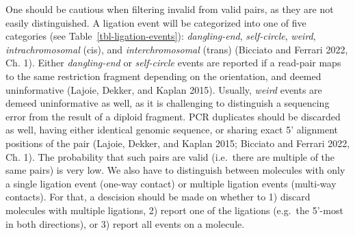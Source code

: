 \documentclass[
  11pt,
  a4paper,
]{scrbook}
\let\oldemph\emph
\renewcommand\emph[1]{\oldemph{\color{gray}#1}}
\begin{document}
One should be cautious when filtering invalid from valid pairs, as they
are not easily distinguished. A ligation event will be categorized into
one of five categories (see Table~\ref{tbl-ligation-events}):
\emph{dangling-end}, \emph{self-circle}, \emph{weird},
\emph{intrachromosomal} (cis), and \emph{interchromosomal} (trans)
(Bicciato and Ferrari 2022, Ch. 1). Either \emph{dangling-end} or
\emph{self-circle} events are reported if a read-pair maps to the same
restriction fragment depending on the orientation, and deemed
uninformative (Lajoie, Dekker, and Kaplan 2015). Usually, \emph{weird}
events are demeed uninformative as well, as it is challenging to
distinguish a sequencing error from the result of a diploid fragment.
PCR duplicates should be discarded as well, having either identical
genomic sequence, or sharing exact 5' alignment positions of the pair
(Lajoie, Dekker, and Kaplan 2015; Bicciato and Ferrari 2022, Ch. 1). The
probability that such pairs are valid (i.e.~there are multiple of the
same pairs) is very low. We also have to distinguish between molecules
with only a single ligation event (one-way contact) or multiple ligation
events (multi-way contacts). For that, a descision should be made on
whether to 1) discard molecules with multiple ligations, 2) report one
of the ligations (e.g.~the 5'-most in both directions), or 3) report all
events on a molecule.

\small
\end{document}
